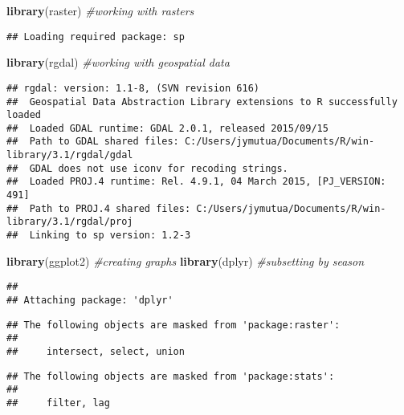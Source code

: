 \documentclass[]{article}
\newenvironment{Shaded}{\begin{snugshade}}{\end{snugshade}}
\newcommand{\KeywordTok}[1]{\textcolor[rgb]{0.13,0.29,0.53}{\textbf{{#1}}}}
\newcommand{\CommentTok}[1]{\textcolor[rgb]{0.56,0.35,0.01}{\textit{{#1}}}}
\newcommand{\NormalTok}[1]{{#1}}
\begin{document}
\begin{Shaded}
\begin{Highlighting}[]
\KeywordTok{library}\NormalTok{(raster) }\CommentTok{#working with rasters}
\end{Highlighting}
\end{Shaded}

\begin{verbatim}
## Loading required package: sp
\end{verbatim}

\begin{Shaded}
\begin{Highlighting}[]
\KeywordTok{library}\NormalTok{(rgdal) }\CommentTok{#working with geospatial data}
\end{Highlighting}
\end{Shaded}

\begin{verbatim}
## rgdal: version: 1.1-8, (SVN revision 616)
##  Geospatial Data Abstraction Library extensions to R successfully loaded
##  Loaded GDAL runtime: GDAL 2.0.1, released 2015/09/15
##  Path to GDAL shared files: C:/Users/jymutua/Documents/R/win-library/3.1/rgdal/gdal
##  GDAL does not use iconv for recoding strings.
##  Loaded PROJ.4 runtime: Rel. 4.9.1, 04 March 2015, [PJ_VERSION: 491]
##  Path to PROJ.4 shared files: C:/Users/jymutua/Documents/R/win-library/3.1/rgdal/proj
##  Linking to sp version: 1.2-3
\end{verbatim}

\begin{Shaded}
\begin{Highlighting}[]
\KeywordTok{library}\NormalTok{(ggplot2) }\CommentTok{#creating graphs}
\KeywordTok{library}\NormalTok{(dplyr) }\CommentTok{#subsetting by season}
\end{Highlighting}
\end{Shaded}

\begin{verbatim}
## 
## Attaching package: 'dplyr'
\end{verbatim}

\begin{verbatim}
## The following objects are masked from 'package:raster':
## 
##     intersect, select, union
\end{verbatim}

\begin{verbatim}
## The following objects are masked from 'package:stats':
## 
##     filter, lag
\end{verbatim}
\end{document}
